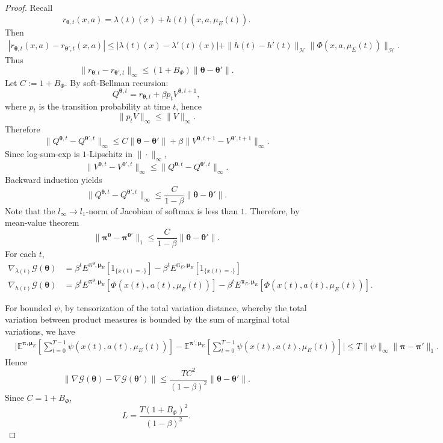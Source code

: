 \documentclass[10pt,a4paper]{amsart}
\newcommand{\bmu}{{\boldsymbol \mu}}
\newcommand{\bpi}{{\boldsymbol \pi}}
\begin{document}
\begin{proof}
Recall
\[
r_{\boldsymbol\theta,t}(x,a)
=
\lambda(t)(x)
+
h(t)(x,a,\mu_E(t)).
\]
Then
\begin{align*}
|r_{\boldsymbol\theta,t}(x,a)
-
r_{\boldsymbol\theta',t}(x,a)|
\le
|\lambda(t)(x)-\lambda'(t)(x)| +
\|h(t)-h'(t)\|_{\mathcal H}
\|\Phi(x,a,\mu_E(t))\|_{\mathcal H}.
\end{align*}
Thus
\[
\|r_{\boldsymbol\theta,t}
-
r_{\boldsymbol\theta',t}\|_\infty
\le
(1+B_\Phi)
\|\boldsymbol\theta-\boldsymbol\theta'\|.
\]
Let $C:=1+B_\Phi$. By soft-Bellman recursion:
\[
Q^{\boldsymbol\theta,t}
=
r_{\boldsymbol\theta,t}
+
\beta p_t V^{\boldsymbol\theta,t+1},
\]
where $p_t$ is the transition probability at time $t$, hence
\[
\|p_t V\|_\infty \le \|V\|_\infty.
\]
Therefore
\[
\|Q^{\boldsymbol\theta,t}
-
Q^{\boldsymbol\theta',t}\|_\infty
\le
C\|\boldsymbol\theta-\boldsymbol\theta'\|
+
\beta
\|V^{\boldsymbol\theta,t+1}
-
V^{\boldsymbol\theta',t+1}\|_\infty.
\]
Since log-sum-exp is $1$-Lipschitz in $\|\cdot\|_\infty$,
\[
\|V^{\boldsymbol\theta,t}
-
V^{\boldsymbol\theta',t}\|_\infty
\le
\|Q^{\boldsymbol\theta,t}
-
Q^{\boldsymbol\theta',t}\|_\infty.
\]
Backward induction yields
\[
\|Q^{\boldsymbol\theta,t}
-
Q^{\boldsymbol\theta',t}\|_\infty
\le
\frac{C}{1-\beta}
\|\boldsymbol\theta-\boldsymbol\theta'\|.
\]
Note that the $l_{\infty} \to l_1$-norm of Jacobian of softmax is less than $1$. Therefore, by mean-value theorem
\[
\|\boldsymbol\pi^{\boldsymbol\theta}
-
\boldsymbol\pi^{\boldsymbol\theta'}\|_{1}
\le
\frac{C}{1-\beta}
\|\boldsymbol\theta-\boldsymbol\theta'\|.
\]
For each $t$,
\begin{align*}
\nabla_{\lambda(t)}
\mathcal G(\boldsymbol\theta)
&=
\beta^t
E^{\boldsymbol\pi^{\boldsymbol\theta},\bmu_E}
[1_{\{x(t) = \cdot\}}] - \beta^t
E^{\bpi_E,\bmu_E}
[1_{\{x(t) = \cdot\}}] \\
\nabla_{h(t)}
\mathcal G(\boldsymbol\theta) 
&=
\beta^t
E^{\boldsymbol\pi^{\boldsymbol\theta},\bmu_E}
[\Phi(x(t),a(t),\mu_E(t))] - \beta^t
E^{\bpi_E,\bmu_E}
[\Phi(x(t),a(t),\mu_E(t))].
\end{align*}

For bounded $\psi$, by tensorization of the total variation distance, whereby the total variation between product measures is bounded by the sum of marginal total variations, we have
\begin{align*}
&\bigg|\mathbb E^{\boldsymbol\pi,\bmu_E}\!\left[\sum_{t=0}^{T-1}\psi(x(t),a(t),\mu_E(t))\right]
-
\mathbb E^{\boldsymbol\pi',\bmu_E}\!\left[\sum_{t=0}^{T-1}\psi(x(t),a(t),\mu_E(t))\right]\!\bigg|
\le
T \|\psi\|_{\infty}
\|\boldsymbol\pi-\boldsymbol\pi'\|_1.
\end{align*}
Hence
\[
\|\nabla\mathcal G(\boldsymbol\theta)
-
\nabla\mathcal G(\boldsymbol\theta')\|
\le
\frac{T C^2}{(1-\beta)^2}
\|\boldsymbol\theta-\boldsymbol\theta'\|.
\]
Since $C=1+B_\Phi$,
\[
L
=
\frac{T(1+B_\Phi)^2}{(1-\beta)^2}.
\]

\end{proof}
\end{document}
